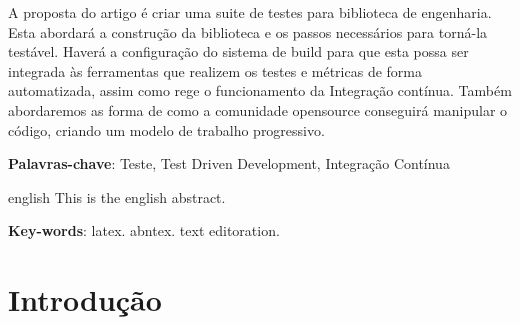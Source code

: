 \documentclass[
	article,			%
	12pt,				%
	oneside,			%
	a4paper,			%
	english,			
	brazil,
	sumario=tradicional
	]{abntex2}
\begin{document}

\frenchspacing 


%
%
\maketitle

\begin{resumoumacoluna}
A proposta do artigo é criar uma suite de testes para biblioteca de engenharia. Esta abordará a construção da biblioteca e os passos necessários para torná-la testável.
Haverá a configuração do sistema de build para que esta possa ser integrada às ferramentas que realizem os testes e métricas de forma automatizada, assim como rege o funcionamento da Integração contínua.
Também abordaremos as forma de como a comunidade opensource conseguirá manipular o código, criando um modelo de trabalho progressivo.

 \vspace{\onelineskip}
 
 \noindent
 \textbf{Palavras-chave}: Teste, Test Driven Development, Integração Contínua
\end{resumoumacoluna}

\begin{resumo}[Abstract]
 \begin{otherlanguage*}{english}
   This is the english abstract.

   \vspace{\onelineskip}
 
   \noindent 
   \textbf{Key-words}: latex. abntex. text editoration.
 \end{otherlanguage*}
\end{resumo}

\textual

\section*{Introdução}
\end{document}
